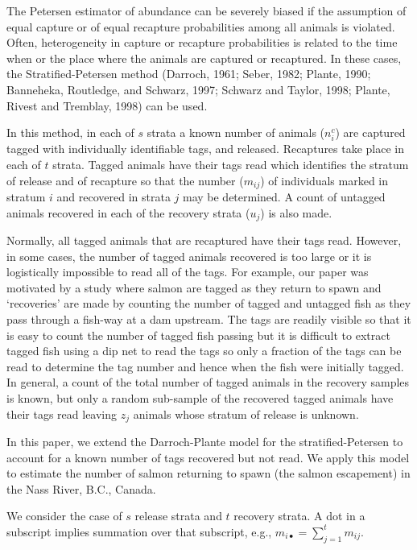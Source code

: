 
The Petersen estimator of abundance 
can be severely biased if the assumption of 
equal capture or of equal recapture probabilities among all animals
is violated.
Often, heterogeneity in capture or recapture probabilities is related to the
time when or the place where the animals are captured or recaptured.
In these cases, the Stratified-Petersen method (Darroch, 1961;
Seber, 1982;  Plante, 1990;
Banneheka, Routledge, and Schwarz, 1997; Schwarz and Taylor, 1998;
Plante, Rivest and Tremblay, 1998) can be used.

In this method, in each of $s$ strata
a known number of animals ($n_i^c$) are captured
tagged with individually 
identifiable tags,
and released.
Recaptures take place in each of $t$ strata.
Tagged animals have their tags read which identifies the stratum of release and
of recapture so that the number ($m_{ij}$) of individuals marked
in stratum $i$ and recovered in strata $j$ may be determined.
A count of untagged animals recovered in each of the recovery strata
($u_j$) is also made.

Normally, all tagged animals that are recaptured  have their tags read. However, in 
some cases, the number of tagged animals recovered is too large or it is 
logistically impossible to read all of the tags. 
For example, our paper was motivated by a study where salmon are tagged
as they return to spawn and `recoveries' are made by counting the number
of tagged and untagged fish as they pass through a fish-way at a dam
upstream. The tags are readily visible so that it is easy to count the number of tagged
fish passing 
but it is difficult to extract tagged fish using a dip net to read the tags so
only a fraction of the tags can be read to determine the tag number and hence
when the fish were initially tagged.
In general, a count of the total number
of tagged animals in the recovery samples is known, but only a random
sub-sample of the recovered tagged animals have their tags read leaving
$z_j$ animals whose stratum of release is unknown.

In this paper, we extend the Darroch-Plante model for the stratified-Petersen to account
for a known number of tags recovered but not read. We apply this model to estimate
the number of salmon returning to spawn (the salmon escapement) in the Nass
River, B.C., Canada. 


We consider the case of $s$ release strata and $t$ recovery strata.
A dot in a subscript implies summation over that subscript, e.g.,
$m_{i\bullet }=\sum\limits_{j=1}^t {m_{ij}}$.


